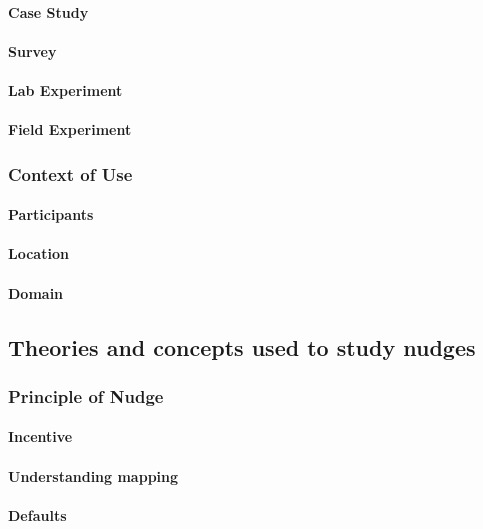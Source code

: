 \paragraph{Case Study}
\paragraph{Survey}
\paragraph{Lab Experiment}
\paragraph{Field Experiment}

\subsubsection{Context of Use}
\paragraph{Participants}
\paragraph{Location}
\paragraph{Domain}


\subsection{Theories and concepts used to study nudges}

\subsubsection{Principle of Nudge}
\paragraph{Incentive}
\paragraph{Understanding mapping}
\paragraph{Defaults}
